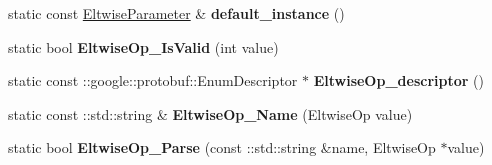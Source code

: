 \begin{DoxyCompactItemize}
static const \mbox{\hyperlink{classcaffe_1_1_eltwise_parameter}{Eltwise\+Parameter}} \& {\bfseries default\+\_\+instance} ()
\item 
\mbox{\label{classcaffe_1_1_eltwise_parameter_addecd0ef048eb7ba4eb13fadcfaf86a2}} 
static bool {\bfseries Eltwise\+Op\+\_\+\+Is\+Valid} (int value)
\item 
\mbox{\label{classcaffe_1_1_eltwise_parameter_a0566f8803800660522c3aa591e314589}} 
static const \+::google\+::protobuf\+::\+Enum\+Descriptor $\ast$ {\bfseries Eltwise\+Op\+\_\+descriptor} ()
\item 
\mbox{\label{classcaffe_1_1_eltwise_parameter_aab41aef10f3132cd9dfb45abc028a001}} 
static const \+::std\+::string \& {\bfseries Eltwise\+Op\+\_\+\+Name} (Eltwise\+Op value)
\item 
\mbox{\label{classcaffe_1_1_eltwise_parameter_abc234d7d495e85a9b8447a42b289cb83}} 
static bool {\bfseries Eltwise\+Op\+\_\+\+Parse} (const \+::std\+::string \&name, Eltwise\+Op $\ast$value)
\end{DoxyCompactItemize}

